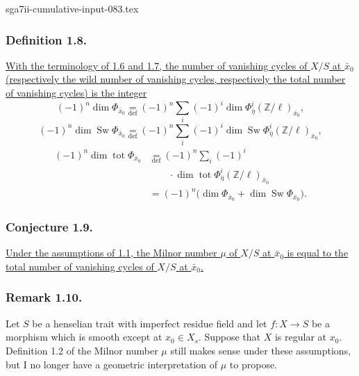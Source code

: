 \begin{filecontents*}{sga7ii-cumulative-input-083.tex}
\subsubsection*{Definition 1.8.}
\underline{With the terminology of 1.6 and 1.7, the number of
vanishing cycles of $X/S$ at $\bar x_0$ (respectively the wild
number of vanishing cycles, respectively the total number of
vanishing cycles) is the integer}
\[
(-1)^n\dim\Phi_{\bar x_0}
\underset{\mathrm{def}}{=}
(-1)^n\sum_i(-1)^i
\dim\Phi^i_{\bar\eta}(\mathbb Z/\ell)_{\bar x_0},
\]
\[
(-1)^n\dim\operatorname{Sw}\Phi_{\bar x_0}
\underset{\mathrm{def}}{=}
(-1)^n\sum_i(-1)^i
\dim\operatorname{Sw}
\Phi^i_{\bar\eta}(\mathbb Z/\ell)_{\bar x_0},
\]
\[
\begin{aligned}
(-1)^n\dim\operatorname{tot}\Phi_{\bar x_0}
&\underset{\mathrm{def}}{=}
(-1)^n\sum_i(-1)^i\\[-2pt]
&\qquad{}\cdot\dim\operatorname{tot}
\Phi^i_{\bar\eta}(\mathbb Z/\ell)_{\bar x_0}\\
&=(-1)^n\bigl(
\dim\Phi_{\bar x_0}+\dim\operatorname{Sw}\Phi_{\bar x_0}
\bigr).
\end{aligned}
\]

\subsubsection*{Conjecture 1.9.}
\underline{Under the assumptions of 1.1, the Milnor number $\mu$ of
$X/S$ at $\bar x_0$ is equal to the total number of vanishing cycles
of $X/S$ at $\bar x_0$.}

\subsubsection*{Remark 1.10.}
Let $S$ be a henselian trait with imperfect residue field and let
$f:X\to S$ be a morphism which is smooth except at
$x_0\in X_s$.  Suppose that $X$ is regular at $x_0$.  Definition
1.2 of the Milnor number $\mu$ still makes sense under these
assumptions, but I no longer have a geometric interpretation of
$\mu$ to propose.
\end{filecontents*}
